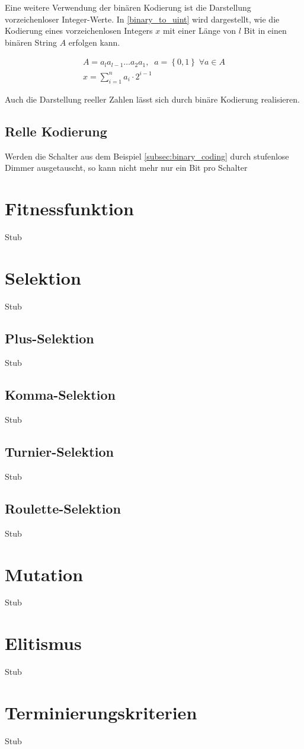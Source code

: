 Eine weitere Verwendung der binären Kodierung ist die Darstellung vorzeichenloser Integer-Werte. In \ref{binary_to_uint} wird dargestellt, wie die Kodierung eines vorzeichenlosen Integers $x$ mit einer Länge von $l$ Bit in einen binären String $A$ erfolgen kann. 

\begin{gather}\label{eq:binary_to_uint}
A = a_l a_{l-1} \dots a_2 a_1,\;\; a = \left\{0, 1\right\} \; \forall a \in A \nonumber \\
x = \sum\limits_{i=1}^n a_i \cdot 2^{i-1}
\end{gather}

Auch die Darstellung reeller Zahlen lässt sich durch binäre Kodierung realisieren. 
\subsection{Relle Kodierung}
Werden die Schalter aus dem Beispiel \ref{subsec:binary_coding} durch stufenlose Dimmer ausgetauscht, so kann nicht mehr nur ein Bit pro Schalter

\section{Fitnessfunktion}
Stub

\section{Selektion}
Stub

\subsection{Plus-Selektion}
Stub

\subsection{Komma-Selektion}
Stub

\subsection{Turnier-Selektion}
Stub

\subsection{Roulette-Selektion}
Stub

\section{Mutation}
Stub

\section{Elitismus}
Stub

\section{Terminierungskriterien}
Stub
